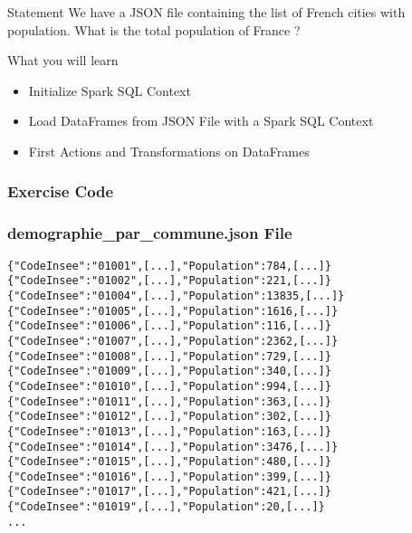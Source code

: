 \documentclass[slidetop,9pt,utf8]{beamer}
\begin{document}
\begin{CJK}{UTF8}{gbsn}
\begin{frame}
  \begin{block}{Statement}
    We have a JSON file containing the list of French cities with population. What is the total population of France ?
  \end{block}

  \begin{block}{What you will learn}
    \begin{itemize}
      \item Initialize Spark SQL Context
      \item Load DataFrames from JSON File with a Spark SQL Context
      \item First Actions and Transformations on DataFrames
    \end{itemize}
  \end{block}

\end{frame}

\begin{frame}
  \frametitle{Exercise Code}

  

\end{frame}

\begin{frame}[fragile]
  \frametitle{demographie\_par\_commune.json File}

  \begin{verbatim}
{"CodeInsee":"01001",[...],"Population":784,[...]}
{"CodeInsee":"01002",[...],"Population":221,[...]}
{"CodeInsee":"01004",[...],"Population":13835,[...]}
{"CodeInsee":"01005",[...],"Population":1616,[...]}
{"CodeInsee":"01006",[...],"Population":116,[...]}
{"CodeInsee":"01007",[...],"Population":2362,[...]}
{"CodeInsee":"01008",[...],"Population":729,[...]}
{"CodeInsee":"01009",[...],"Population":340,[...]}
{"CodeInsee":"01010",[...],"Population":994,[...]}
{"CodeInsee":"01011",[...],"Population":363,[...]}
{"CodeInsee":"01012",[...],"Population":302,[...]}
{"CodeInsee":"01013",[...],"Population":163,[...]}
{"CodeInsee":"01014",[...],"Population":3476,[...]}
{"CodeInsee":"01015",[...],"Population":480,[...]}
{"CodeInsee":"01016",[...],"Population":399,[...]}
{"CodeInsee":"01017",[...],"Population":421,[...]}
{"CodeInsee":"01019",[...],"Population":20,[...]}
...
  \end{verbatim}
\end{frame}


\end{CJK}
\end{document}

